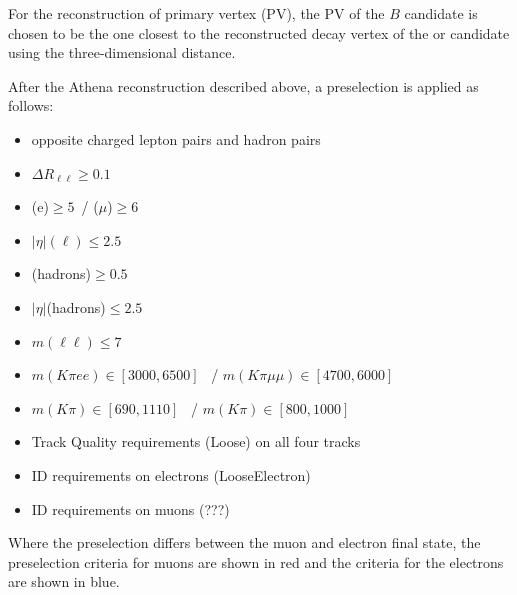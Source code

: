 For the reconstruction of primary vertex (PV), the PV of the $B$ candidate is chosen to be
the one closest to the reconstructed decay vertex of the \Bd or \Bdb candidate using the three-dimensional
distance.

After the Athena reconstruction described above, a preselection is applied as follows:
\begin{itemize}
\setlength{\itemsep}{0pt}%
\setlength{\parskip}{0pt}%
 \item opposite charged lepton pairs and hadron pairs
 \item $\Delta R_{\ell\ell} \geq 0.1$
 \item {\color{blue}\pt(e)$\geq 5$~\gev }/{\color{red} \pt($\mu$)$\geq 6$~\gev}
 \item $|\eta|(\ell)\leq 2.5$
 \item \pt(hadrons)$\geq 0.5$~\gev
 \item $|\eta|$(hadrons)$\leq 2.5$
 \item $m(\ell\ell)\leq 7$~\gev
 \item {\color{blue}$m(K\pi ee) \in [3000,6500]$~\mev} / {\color{red}$m(K\pi \mu\mu) \in [4700,6000]$~\mev}
 \item {\color{blue}$m(K\pi) \in [690, 1110]$~\mev} / {\color{red}$m(K\pi) \in [800, 1000]$~\mev}
 \item Track Quality requirements (Loose) on all four tracks
 \item {\color{blue}ID requirements on electrons (LooseElectron)}
 \item {\color{red}ID requirements on muons (???)}
\end{itemize}

Where the preselection differs between the muon and electron final state,
the preselection criteria for muons are shown in red and the criteria for
the electrons are shown in blue.




